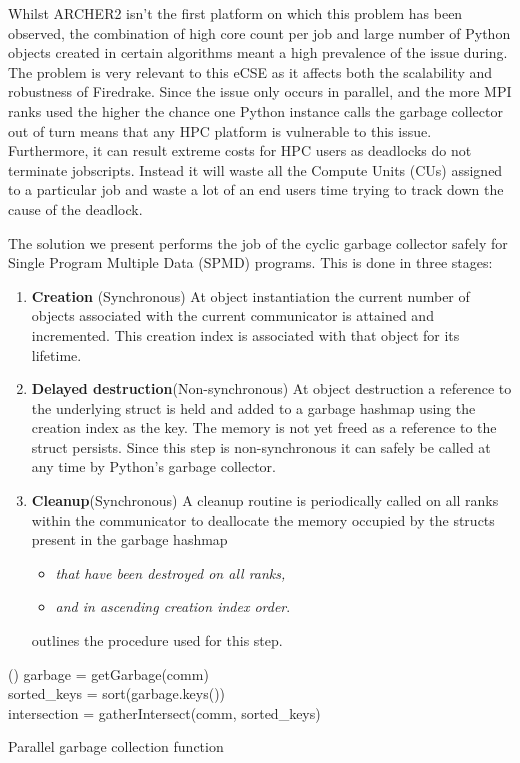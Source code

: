 \documentclass[a4paper,11pt]{article}
\begin{document}
Whilst ARCHER2 isn't the first platform on which this problem has been observed, the combination of high core count per job and large number of Python objects created in certain algorithms meant a high prevalence of the issue during.
The problem is very relevant to this eCSE as it affects both the scalability and robustness of Firedrake.
Since the issue only occurs in parallel, and the more MPI ranks used the higher the chance one Python instance calls the garbage collector out of turn means that any HPC platform is vulnerable to this issue.
Furthermore, it can result extreme costs for HPC users as deadlocks do not terminate jobscripts.
Instead it will waste all the Compute Units (CUs) assigned to a particular job and waste a lot of an end users time trying to track down the cause of the deadlock.

The solution we present performs the job of the cyclic garbage collector safely for Single Program Multiple Data (SPMD) programs.
This is done in three stages:
\begin{enumerate}
	\item \label{item:create}\textbf{Creation} (Synchronous)
	At object instantiation the current number of objects associated with the current communicator is attained and incremented.
	This creation index is associated with that object for its lifetime.
	\item \label{item:destroy}\textbf{Delayed destruction}(Non-synchronous)
	At object destruction a reference to the underlying struct is held and added to a garbage hashmap using the creation index as the key.
	The memory is not yet freed as a reference to the struct persists.
	Since this step is non-synchronous it can safely be called at any time by Python's garbage collector.
	\item \label{item:cleanup}\textbf{Cleanup}(Synchronous)
	A cleanup routine is periodically called on all ranks within the communicator to deallocate the memory occupied by the structs present in the garbage hashmap 
	\begin{itemize}[topsep=0pt, partopsep=0pt, itemsep=1pt, parsep=1pt]
	\item \emph{that have been destroyed on all ranks,}
	\item \emph{and in ascending creation index order}.
    \end{itemize}
     outlines the procedure used for this step.
\end{enumerate}

\begin{algorithm}[htp]
	\Function(){
		garbage = getGarbage(comm)\\
		sorted\_keys = sort(garbage.keys())\\
		intersection = gatherIntersect(comm, sorted\_keys)\\
	}
	\caption[]{Parallel garbage collection function}
	\label{alg:cleanup}
\end{algorithm}
\end{document}
